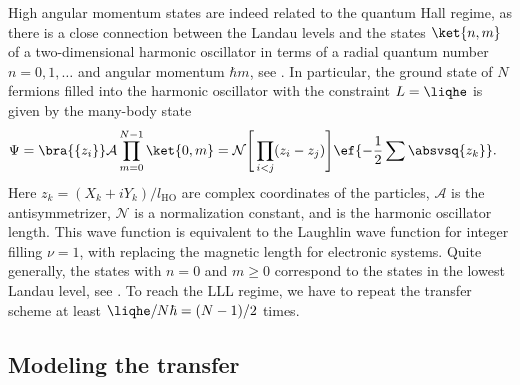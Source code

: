 High angular momentum states are indeed related to the quantum Hall regime, as there is a close connection between the Landau levels and the states $\ket{n,m}$ of a two-dimensional harmonic oscillator in terms of a radial quantum number $n=0,1,\dots$ and angular momentum $\hbar m$, see . In particular, the ground state of $N$ fermions filled into the harmonic oscillator with the constraint $L=\liqhe$ is given by the many-body state
\begin{align}
\Psi&= \bra{\{z_i\}}\mathcal{A} \prod_{m=0}^{N-1} \ket{0,m} = \mathcal{N}\Bigg[\prod_{i<j} (z_i-z_j) \Bigg] \ef{-\frac{1}{2}\sum\absvsq{z_k}}.
\end{align}
Here $z_k=(X_k+i Y_k)/l_\text{HO}$ are complex coordinates of the particles, $\mathcal{A}$ is the antisymmetrizer, $\mathcal{N}$ is a normalization constant, and  is the harmonic oscillator length. This wave function is equivalent to the Laughlin wave function for integer filling $\nu=1$, with    replacing the magnetic length  for electronic systems. Quite generally, the states with $n=0$ and $m\ge 0$ correspond to the states in the lowest Landau level, see .
To reach the LLL regime, we have to repeat the transfer scheme at least $\liqhe/N\hbar=(N-1)/2$ times.

\subsection{Modeling the transfer}


